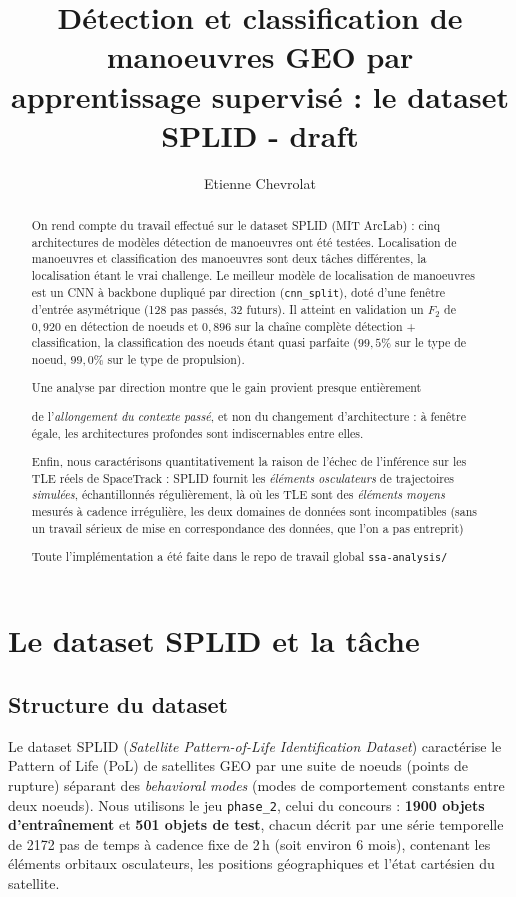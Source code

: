 \documentclass{article}
\title{Détection et classification de manoeuvres GEO par apprentissage supervisé : le dataset SPLID - draft}
\author{Etienne Chevrolat}
\date{}
\begin{document}
\maketitle

\begin{abstract}
    On rend compte du travail effectué sur le dataset SPLID (MIT ArcLab) : cinq architectures de modèles détection de manoeuvres ont été testées. Localisation de manoeuvres et classification des manoeuvres sont deux tâches différentes, la localisation étant le vrai challenge.
    Le meilleur modèle de localisation de manoeuvres est un CNN à backbone dupliqué 
    par direction (\texttt{cnn\_split}), 
    doté d'une fenêtre d'entrée asymétrique (128 pas passés, 32 futurs). 
    Il atteint en validation un $F_2$ de $0{,}920$ en détection 
    de noeuds et $0{,}896$ sur la chaîne complète détection + classification, 
    la classification des noeuds étant quasi parfaite ($99{,}5\%$ sur 
    le type de noeud, $99{,}0\%$ sur le type de propulsion).
    
    Une analyse par direction montre que le gain provient presque entièrement

    de l'\emph{allongement du contexte passé}, et non du changement 
    d'architecture : à fenêtre égale, 
    les architectures profondes sont indiscernables entre elles.
    
    Enfin, nous caractérisons quantitativement la raison de l'échec de l'inférence sur les TLE réels de SpaceTrack : SPLID fournit les \emph{éléments osculateurs} de trajectoires \emph{simulées}, échantillonnés régulièrement, là où les TLE sont des \emph{éléments moyens} mesurés à cadence irrégulière, les deux domaines de données sont incompatibles (sans un travail sérieux de mise en correspondance des données, que l'on a pas entreprit)
    
    Toute l'implémentation a été faite dans le repo de travail global \texttt{ssa-analysis/}
\end{abstract}

\section{Le dataset SPLID et la tâche}

\subsection{Structure du dataset}

Le dataset SPLID (\textit{Satellite Pattern-of-Life Identification Dataset}) caractérise le Pattern of Life (PoL) de satellites GEO par une suite de noeuds (points de rupture) séparant des \textit{behavioral modes} (modes de comportement constants entre deux noeuds).
Nous utilisons le jeu \texttt{phase\_2}, celui du concours : \textbf{1900 objets d'entraînement} et \textbf{501 objets de test}, chacun décrit par une série temporelle de 2172 pas de temps à cadence fixe de 2\,h (soit environ 6 mois), contenant les éléments orbitaux osculateurs, les positions géographiques et l'état cartésien du satellite.
\end{document}
